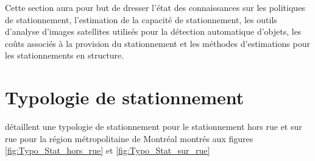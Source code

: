 \label{sec:RevLitt}

Cette section aura pour but de dresser l'état des connaissances sur les politiques de stationnement, l'estimation de la capacité de stationnement, les outils d'analyse d'images satellites utilisés pour la détection automatique d'objets, les coûts associés à la provision du stationnement et les méthodes d'estimations pour les stationnements en structure.

\section{Typologie de stationnement}\label{sec:typologie_stationnement}

\textcite{Morency:StationnementDans:2017} détaillent une typologie de stationnement pour le stationnement hors rue et sur rue pour la région métropolitaine de Montréal montrés aux figures \ref{fig:Typo_Stat_hors_rue} et \ref{fig:Typo_Stat_sur_rue}

